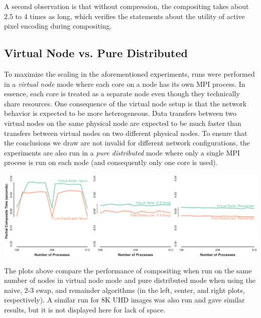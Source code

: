 \documentclass{vgtc}                          %
\newcommand*{\keyterm}[1]{\emph{#1}}
\newcommand{\textalgorithm}[1]{\textsf{#1}\xspace}
\newcommand{\ttswap}{\textalgorithm{2-3 swap}}
\newcommand{\naive}{\textalgorithm{naive}}
\newcommand{\remainder}{\textalgorithm{remainder}}
\begin{document}
A second observation is that without compression, the compositing takes about 2.5 to 4 times as long, which verifies the statements about the utility of active pixel encoding during compositing.

\subsection{Virtual Node vs. Pure Distributed}
\label{sec:VNCompare}

To maximize the scaling in the aforementioned experiments, runs were performed in a \keyterm{virtual node} mode where each core on a node has its own MPI process.
In essence, each core is treated as a separate node even though they technically share resources.
One consequence of the virtual node setup is that the network behavior is expected to be more heterogeneous.
Data transfers between two virtual nodes on the same physical node are expected to be much faster than transfers between virtual nodes on two different physical nodes.
To ensure that the conclusions we draw are not invalid for different network configurations, the experiments are also run in a \keyterm{pure distributed} mode where only a single MPI process is run on each node (and consequently only one core is used).

\noindent
\includegraphics[width=\linewidth]{vn-vs-smp-hdtv}

The plots above compare the performance of compositing when run on the same number of nodes in virtual node mode and pure distributed mode when using the \naive, \ttswap, and \remainder algorithms (in the left, center, and right plots, respectively).
A similar run for 8K UHD images was also run and gave similar results, but it is not displayed here for lack of space.
\end{document}
